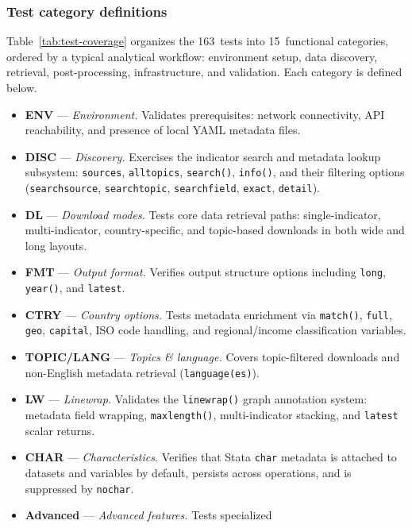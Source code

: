\documentclass[bib]{statapress}
\begin{document}
\subsubsection{Test category definitions}

Table~\ref{tab:test-coverage} organizes the 163~tests into 15~functional
categories, ordered by a typical analytical workflow: environment setup,
data discovery, retrieval, post-processing, infrastructure, and validation.
Each category is defined below.

\begin{itemize}
  \item \textbf{ENV} --- \emph{Environment.}  Validates prerequisites: network
    connectivity, API reachability, and presence of local YAML metadata files.
  \item \textbf{DISC} --- \emph{Discovery.}  Exercises the indicator search and
    metadata lookup subsystem: \texttt{sources}, \texttt{alltopics},
    \texttt{search()}, \texttt{info()}, and their filtering options
    (\texttt{searchsource}, \texttt{searchtopic}, \texttt{searchfield},
    \texttt{exact}, \texttt{detail}).
  \item \textbf{DL} --- \emph{Download modes.}  Tests core data retrieval paths:
    single-indicator, multi-indicator, country-specific, and topic-based
    downloads in both wide and long layouts.
  \item \textbf{FMT} --- \emph{Output format.}  Verifies output structure options
    including \texttt{long}, \texttt{year()}, and \texttt{latest}.
  \item \textbf{CTRY} --- \emph{Country options.}  Tests metadata enrichment via
    \texttt{match()}, \texttt{full}, \texttt{geo}, \texttt{capital},
    ISO code handling, and regional/income classification variables.
  \item \textbf{TOPIC/LANG} --- \emph{Topics \& language.}  Covers topic-filtered
    downloads and non-English metadata retrieval (\texttt{language(es)}).
  \item \textbf{LW} --- \emph{Linewrap.}  Validates the \texttt{linewrap()} graph
    annotation system: metadata field wrapping, \texttt{maxlength()},
    multi-indicator stacking, and \texttt{latest} scalar returns.
  \item \textbf{CHAR} --- \emph{Characteristics.}  Verifies that Stata
    \texttt{char} metadata is attached to datasets and variables by default,
    persists across operations, and is suppressed by \texttt{nochar}.
  \item \textbf{Advanced} --- \emph{Advanced features.}  Tests specialized

\end{itemize}
\end{document}
